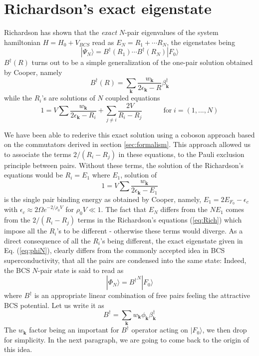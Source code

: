 \documentclass[aps,prb,preprint,groupedaddress,amsmath]{revtex4}
\newcommand{\vk}{\ensuremath{\mathbf{k}}}
\newcommand{\dg}{\ensuremath{\dagger}}
\begin{document}
\section{Richardson's exact eigenstate}
Richardson has shown that the \emph{exact} $N$-pair eigenvalues of the system hamiltonian $H=H_0+V_{BCS}$ read as $E_N=R_1+\cdots{}R_N$, the eigenstates being
\begin{equation}\label{eq:phiN}
|\Psi_N{\rangle}=B^{\dagger}(R_1)\cdots{}B^{\dagger}(R_N)|F_0{\rangle}  
\end{equation}
$B^{\dagger}(R)$ turns out to be a simple generalization of the one-pair solution obtained by Cooper, namely
\begin{equation}  \label{eq:B}
B^{\dagger}(R)=\sum_\vk\frac{w_\vk}{2\epsilon_\vk-R}\beta^{\dagger}_\vk
\end{equation}
while the $R_i$'s are solutions of $N$ coupled equations
\begin{equation}\label{eq:Rich}
1=V\sum\frac{w_{\mathbf{k} }}{2\epsilon_{\mathbf{k} }-R_i}+\sum_{j\neq{i}}%
\frac{2V}{R_i-R_j}\quad\qquad \text{for}\; i=\left(1,...,N\right) 
\end{equation}

We have been able to rederive this exact solution using a coboson approach based on the  commutators derived in section \ref{sec:formalism}.  This approach allowed us to associate the terms $2/(R_i-R_j)$ in these equations, to the Pauli exclusion principle between pairs.  Without these terms, the solution of the Richardson's equations would be $R_i=E_1$ where $E_1$, solution of
\begin{equation}
1=V\sum\frac{w_{\mathbf{k} }}{2\epsilon_{\mathbf{k} }-E_1}
\end{equation}
 is the single pair binding energy as obtained by Cooper, namely, $E_1=2E_{F_0}-\epsilon_c$ with $\epsilon_c\approx2\Omega{}e^{-2/\rho_0V}$ for $\rho_0V\ll1$. The fact that $E_N$ differs from the $NE_1$ comes from the $2/(R_i-R_j)$ terms in the Richardson's equations (\ref{eq:Rich})  which impose all the $R_i$'s to be different - otherwise these terms would diverge. As a direct consequence of all the $R_i$'s being different, the exact eigenstate given in Eq. (\ref{eq:phiN}), clearly differs from the commonly accepted idea  in BCS superconductivity, that all the pairs are condensed into the same state:  Indeed, the BCS $N$-pair state is said to read as 
\begin{equation}\label{eq:phiNBcs}
|\Phi_N{\rangle}={B^{\dagger}}^N|F_0{\rangle}  
\end{equation}
where $B^\dagger$ is an appropriate linear combination of free pairs feeling the attractive BCS potential. Let us write it as 
\begin{equation}\label{eq:bBeta}
B^\dg=\sum_\vk w_{\mathbf{k} }\phi_\vk\beta^\dg_\vk
\end{equation}
The $w_{\mathbf{k} }$ factor  being an important for $B^\dg$ operator acting on $|F_0{\rangle}$, we then drop for simplicity. In the next paragraph, we are going to come back to the origin of this idea.  
\end{document}
